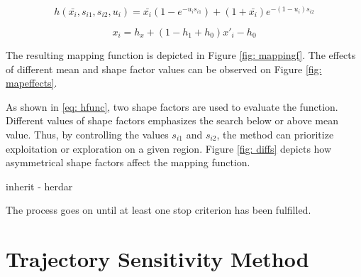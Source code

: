 \begin{equation}
	h(\bar{x_{i}}, s_{i1}, s_{i2}, u_{i}) = \bar{x_{i}}(1 - e^{-u_{i}s_{i1}}) + (1 + \bar{x_{i}})e^{-(1 - u_{i})s_{i2}}
	\label{eq: hfunc}
\end{equation}

\begin{equation}
	x_{i} = h_{x} + (1 - h_{1} + h_{0})x'_{i} - h_{0}
	\label{eq: mappingf}
\end{equation}

The resulting mapping function is depicted in Figure \ref{fig: mappingf}. The effects of different mean and shape factor values can be observed on Figure \ref{fig: mapeffects}.

As shown in \eqref{eq: hfunc}, two shape factors are used to evaluate the function. Different values of shape factors emphasizes the search below or above mean value. Thus, by controlling the values $s_{i1}$ and $s_{i2}$, the method can prioritize exploitation or exploration on a given region. Figure \ref{fig: diffs} depicts how asymmetrical shape factors affect the mapping function.



inherit - herdar

The process goes on until at least one stop criterion has been fulfilled.



\section{Trajectory Sensitivity Method}